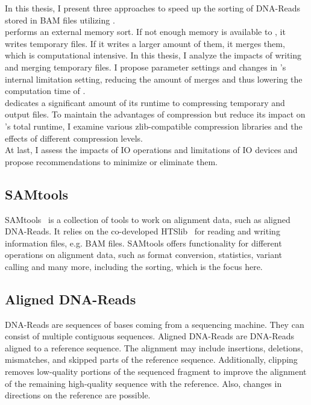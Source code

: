 In this thesis, I present three approaches to speed up the sorting of DNA-Reads stored in BAM files utilizing \sort. \\

\sort performs an external memory sort. If not enough memory is available to \sort, it writes temporary files. If it writes a larger amount of them, it merges them, which is computational intensive. In this thesis, I analyze the impacts of \sort writing and merging temporary files. I propose parameter settings and changes in \sort's internal limitation setting, reducing the amount of merges and thus lowering the computation time of \sort. \\

\sort dedicates a significant amount of its runtime to compressing temporary and output files. To maintain the advantages of compression but reduce its impact on \sort's total runtime, I examine various zlib-compatible compression libraries and the effects of different compression levels. \\

At last, I assess the impacts of IO operations and limitations of IO devices and propose recommendations to minimize or eliminate them.



\subsection{SAMtools}
SAMtools~\cite{12ySamtools} is a collection of tools to work on alignment data, such as aligned DNA-Reads. It relies on the co-developed HTSlib~\cite{bonfield_htslib_2021} for reading and writing information files, e.g. BAM files. SAMtools offers functionality for different operations on alignment data, such as format conversion, statistics, variant calling and many more, including the sorting, which is the focus here. \\

\subsection{Aligned DNA-Reads}
DNA-Reads are sequences of bases coming from a sequencing machine. They can consist of multiple contiguous sequences. Aligned DNA-Reads are DNA-Reads aligned to a reference sequence. The alignment may include insertions, deletions, mismatches, and skipped parts of the reference sequence. Additionally, clipping removes low-quality portions of the sequenced fragment to improve the alignment of the remaining high-quality sequence with the reference. Also, changes in directions on the reference are possible.

